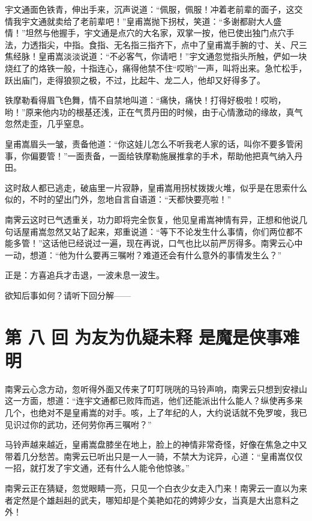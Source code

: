 \documentclass[12pt,oneside]{book}
\begin{document}
宇文通面色铁青，伸出手来，沉声说道：``佩服，佩服！冲着老前辈的面子，这交情我宇文通就卖给了老前辈吧！''皇甫嵩抛下拐杖，笑道：``多谢都尉大人盛情！''坦然与他握手，宇文通是点穴的大名家，双掌一按，他已使出独门点穴手法，力透指尖，中指。食指、无名指三指齐下，点中了皇甫嵩手腕的寸、关、尺三焦经脉！皇甫嵩淡淡说道：``不必客气，你请吧！''宇文通忽觉指头所触，俨如一块烧红了的烙铁一般，十指连心，痛得他禁不住``哎哟''一声，叫将出来。急忙松手，跃出庙门，走得狼狈之极，不过，比起牛、龙二人，他却又好得多了。

铁摩勒看得眉飞色舞，情不自禁地叫道：``痛快，痛快！打得好极啦！哎哟，哟！''原来他内功的根基还浅，正在气贯丹田的时候，由于心情激动的缘故，真气忽然走歪，几乎窒息。

皇甫嵩眉头一皱，责备他道：``你这娃儿怎么不听我老人家的话，叫你不要多管闲事，你偏要管！''一面责备，一面给铁摩勒施展推拿的手术，帮助他把真气纳入丹田。

这时敌人都已逃走，破庙里一片寂静，皇甫嵩用拐杖拨拨火堆，似乎是在思索什么似的，不时的望出门外，忽地自言自语道：``天都快要亮啦！''

南霁云这时已气透重关，功力即将完全恢复，他见皇甫嵩神情有异，正想和他说几句话屋甫嵩忽然又站了起来，郑重说道：``等下不论发生什么事情，你们两位都不能多管！''这话他已经说过一遍，现在再说，口气也比以前严厉得多。南霁云心中一动，想道：``他为什么要再三嘱咐？难道还会有什么意外的事情发生么？''

正是：方喜追兵才击退，一波未息一波生。

欲知后事如何？请听下回分解------

\chapter{第 八 回 为友为仇疑未释
是魔是侠事难明}\label{ux7b2c-ux516b-ux56de-ux4e3aux53cbux4e3aux4ec7ux7591ux672aux91ca-ux662fux9b54ux662fux4fa0ux4e8bux96beux660e}

南霁云心念方动，忽听得外面又传来了叮叮咣咣的马铃声响，南霁云只想到安禄山这一方面，想道：``连宇文通都已败阵而逃，他们还能派出什么能人？纵使再多来几个，也绝对不是皇甫嵩的对手。咳，上了年纪的人，大约说话就不免罗唆，我已见识过你的武功，还何劳你再三嘱咐？''

马铃声越来越近，皇甫嵩盘膝坐在地上，脸上的神情非常奇怪，好像在焦急之中又带着几分愁苦。南霁云已听出只是一人一骑，不禁大为诧异，心道：``皇甫嵩仅仅一招，就打发了宇文通，还有什么人能令他惊骇。''

南霁云正在猜疑，忽觉眼睛一亮，只见一个白衣少女走入门来！南霁云一直以为来者定然是个雄赳赳的武夫，哪知却是个美艳如花的娉婷少女，当真是大出意料之外！
\end{document}
